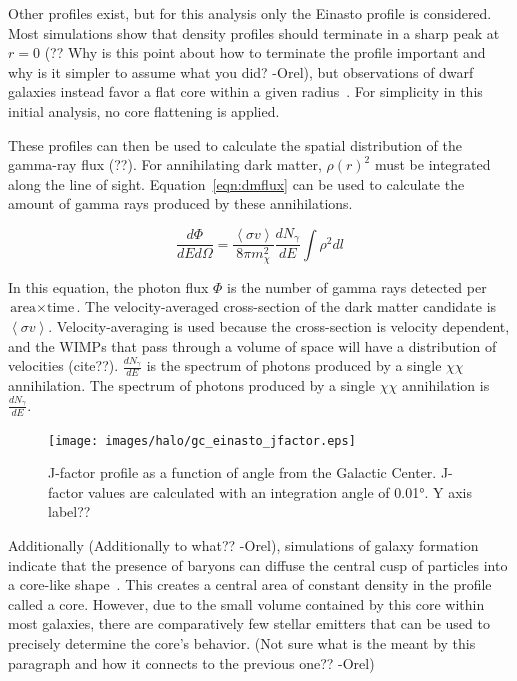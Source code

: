     Other profiles exist, but for this analysis only the Einasto profile is considered.
    Most simulations show that density profiles should terminate in a sharp peak at $r=0$ {\color{red}(?? Why is this point about how to terminate the profile important and why is it simpler to assume what you did? -Orel)}, but observations of dwarf galaxies instead favor a flat core within a given radius~\cite{CoreVsCusp}.
    For simplicity in this initial analysis, no core flattening is applied.
    
    These profiles can then be used to calculate the spatial distribution of the gamma-ray {\color{red}flux (??)}.
    For annihilating dark matter, $\rho\left(r\right)^2$ must be integrated along the line of sight.
    Equation~\ref{eqn:dmflux} can be used to calculate the amount of gamma rays produced by these annihilations.
    
    \begin{equation}\label{eqn:dmflux}
      \frac{ d\Phi }{ dE d \Omega } = \frac{ \left \langle \sigma v \right \rangle }{8 \pi m_\chi^2} \frac{dN_{\gamma}}{dE} \int \rho^2 dl
    \end{equation}
    
    In this equation, the photon flux $\Phi$ is the number of gamma rays detected per $\textrm{area}\times\textrm{time}$.
    The velocity-averaged cross-section of the dark matter candidate is $\left \langle \sigma v \right \rangle$.
    Velocity-averaging is used because the cross-section is velocity dependent, and the WIMPs that pass through a volume of space will have a distribution of velocities {\color{red}(cite??)}.
    $\frac{dN_{\gamma}}{dE}$ is the spectrum of photons produced by a single $\chi\chi$ annihilation.
    The spectrum of photons produced by a single $\chi\chi$ annihilation is $\frac{dN_{\gamma}}{dE}$.
    
    \begin{figure}[ht]
    \centering
      \texttt{[image: images/halo/gc\_einasto\_jfactor.eps]}
      \caption[Galactic Center Einasto Halo Jfactor]{
        J-factor profile as a function of angle from the Galactic Center.
        J-factor values are calculated with an integration angle of \ang{0.01}.
        {\color{red}Y axis label??}
      }
      \label{fig:gchalo_jfactor}
    \end{figure}
    
    {\color{red}Additionally (Additionally to what?? -Orel)}, simulations of galaxy formation indicate that the presence of baryons can diffuse the central cusp of particles into a core-like shape~\cite{corecusp_baryondiffuse1,corecusp_baryondiffuse2}.
    This creates a central area of constant density in the profile called a core.
    However, due to the small volume contained by this core within most galaxies, there are comparatively few stellar emitters that can be used to precisely determine the core's behavior.
    {\color{red}(Not sure what is the meant by this paragraph and how it connects to the previous one?? -Orel)}

